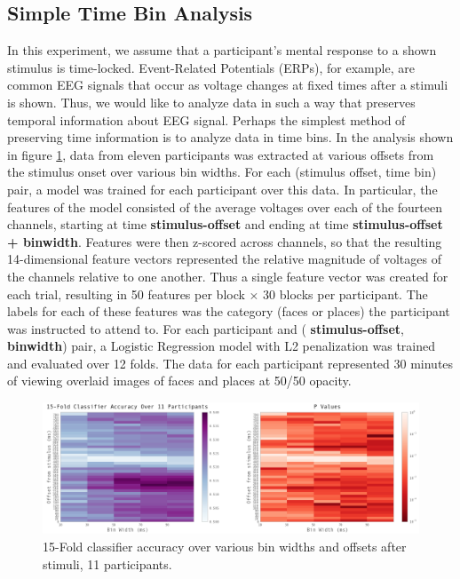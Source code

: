 \documentclass[12pt]{report}
\begin{document}
\subsection{Simple Time Bin Analysis \label{timebin}}

	In this experiment, we assume that a participant's mental response to a shown stimulus is time-locked.  Event-Related Potentials (ERPs), for example, are common EEG signals that occur as voltage changes at fixed times after a stimuli is shown.  Thus, we would like to analyze data in such a way that preserves temporal information about EEG signal.  Perhaps the simplest method of preserving time information is to analyze data in time bins.  In the analysis shown in figure \ref{nfoldsimple}, data from eleven participants was extracted at various offsets from the stimulus onset over various bin widths.  For each (stimulus offset, time bin) pair, a model was trained for each participant over this data.  In particular, the features of the model consisted of the average voltages over each of the fourteen channels, starting at time \textbf{stimulus-offset} and ending at time \textbf{stimulus-offset + binwidth}.  Features were then z-scored across channels, so that the resulting 14-dimensional feature vectors represented the relative magnitude of voltages of the channels relative to one another.  Thus a single feature vector was created for each trial, resulting in 50 features per block $\times$ 30 blocks per participant.  The labels for each of these features was the category (faces or places) the participant was instructed to attend to. For each participant and (\textbf{ stimulus-offset}, \textbf{binwidth}) pair, a Logistic Regression model with L2 penalization was trained and evaluated over 12 folds.  The data for each participant represented 30 minutes of viewing overlaid images of faces and places at 50/50 opacity.

\begin{figure}[t]
\centerline{
\includegraphics[width=7in]{gridsearch_logreg_simple}
}
\caption{15-Fold classifier accuracy over various bin widths and offsets after stimuli, 11 participants.\label{nfoldsimple}}
\end{figure}
\end{document}
